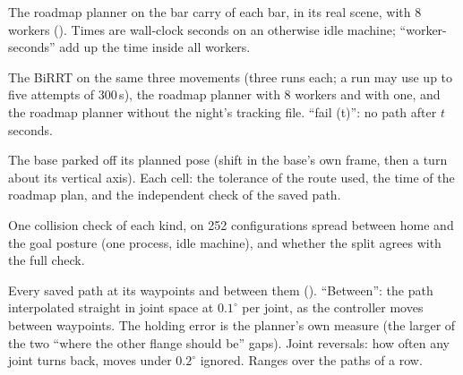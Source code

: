 \begin{table}[h]
\centering
\footnotesize
\setlength{\tabcolsep}{4pt}
\caption{The roadmap planner on the bar carry of each bar, in its real scene, with 8
workers (). Times are wall-clock seconds on an otherwise
idle machine; ``worker-seconds'' add up the time inside all workers.}
\label{tab:robarchplans}
\end{table}

\begin{table}[h]
\centering
\footnotesize
\setlength{\tabcolsep}{4pt}
\caption{The BiRRT on the same three movements (three runs each; a run may use up to
five attempts of 300\,s), the roadmap planner with 8 workers and with one, and the
roadmap planner without the night's tracking file. ``fail (t)'': no path after
$t$ seconds.}
\label{tab:robarchcompare}
\end{table}

\begin{table}[h]
\centering
\footnotesize
\setlength{\tabcolsep}{4pt}
\caption{The base parked off its planned pose (shift in the base's own frame, then a
turn about its vertical axis). Each cell: the tolerance of the route used, the time
of the roadmap plan, and the independent check of the saved path.}
\label{tab:robarchshift}
\end{table}

\begin{table}[h]
\centering
\footnotesize
\setlength{\tabcolsep}{4pt}
\caption{One collision check of each kind, on 252 configurations spread between home
and the goal posture (one process, idle machine), and whether the split agrees with
the full check.}
\label{tab:robarchsplit}
\end{table}

\begin{table}[h]
\centering
\footnotesize
\setlength{\tabcolsep}{4pt}
\caption{Every saved path at its waypoints and between them
(). ``Between'': the path interpolated
straight in joint space at $0.1^\circ$ per joint, as the controller moves between
waypoints. The holding error is the planner's own measure (the larger of the two
``where the other flange should be'' gaps). Joint reversals: how often any joint
turns back, moves under $0.2^\circ$ ignored. Ranges over the paths of a row.}
\label{tab:robarchdense}
\end{table}

